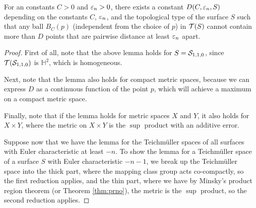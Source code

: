 \begin{lemma}
  \label{lem:packing-argument}
  For an constants $C > 0$ and $\varepsilon_n > 0$, there exists a constant $D(C, \varepsilon_n, S)$ depending on the constants $C$, $\varepsilon_n$, and the topological type of the surface $S$ such that any ball $B_C(p)$ (independent from the choice of $p$) in $\mathcal{T}(S)$ cannot contain more than $D$ points that are pairwise distance at least $\varepsilon_n$ apart.
\end{lemma}

\begin{proof}
  First of all, note that the above lemma holds for $S = \mathcal{S}_{1,1,0}$, since $\mathcal{T}(\mathcal{S}_{1,1,0})$ is $\mathbb{H}^2$, which is homogeneous.

  Next, note that the lemma also holds for compact metric spaces, because we can express $D$ as a continuous function of the point $p$, which will achieve a maximum on a compact metric space.

  Finally, note that if the lemma holds for metric spaces $X$ and $Y$, it also holds for $X \times Y$, where the metric on $X \times Y$ is the $\sup$ product with an additive error.

  Suppose now that we have the lemma for the Teichmüller spaces of all surfaces with Euler characteristic at least $-n$.
  To show the lemma for a Teichmüller space of a surface $S$ with Euler characteristic $-n-1$, we break up the Teichmüller space into the thick part, where the mapping class group acts co-compactly, so the first reduction applies, and the thin part, where we have by Minsky's product region theorem \cite[Theorem 6.1]{1077244446} (or Theorem \ref{thm:prno}), the metric is the $\sup$ product, so the second reduction applies.
\end{proof}

